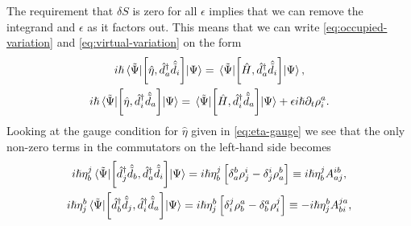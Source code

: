             The requirement that $\delta S$ is zero for all $\epsilon$ implies
            that we can remove the integrand and $\epsilon$ as it factors out.
            This means that we can write \autoref{eq:occupied-variation} and
            \autoref{eq:virtual-variation} on the form
            \begin{gather}
                i\hslash\mel*{\tilde{\Psi}}{
                    \left[
                        \hat{\eta}
                    , 
                        \hat{d}^{\dagger}_{a}\hat{\tilde{d}}_{i}
                    \right]
                }{\Psi}
                =
                \mel*{\tilde{\Psi}}{
                    \left[
                        \hat{H}
                    , 
                        \hat{d}^{\dagger}_{a}\hat{\tilde{d}}_{i}
                    \right]
                }{\Psi},
                \\
                i\hslash\mel*{\tilde{\Psi}}{
                    \left[
                        \hat{\eta}
                    , 
                        \hat{d}^{\dagger}_{i}\hat{\tilde{d}}_{a}
                    \right]
                }{\Psi}
                =
                \mel*{\tilde{\Psi}}{
                    \left[
                        \hat{H}
                    , 
                        \hat{d}^{\dagger}_{i}\hat{\tilde{d}}_{a}
                    \right]
                }{\Psi}
                + \epsilon i\hslash\partial_t\rho^{a}_{i}.
            \end{gather}
            Looking at the gauge condition for $\hat{\eta}$ given in
            \autoref{eq:eta-gauge} we see that the only non-zero terms in the
            commutators on the left-hand side becomes
            \begin{gather}
                i\hslash\eta^{j}_{b}\mel*{\tilde{\Psi}}{
                    \left[
                        \hat{d}^{\dagger}_{j}\hat{\tilde{d}}_{b}
                    , 
                        \hat{d}^{\dagger}_{a}\hat{\tilde{d}}_{i}
                    \right]
                }{\Psi}
                = i\hslash\eta^{j}_{b}\left[ 
                    \delta^{b}_{a}\rho^{i}_{j}
                    - \delta^{i}_{j}\rho^{b}_{a}
                 \right]
                \equiv
                i\hslash\eta^{j}_{b}A^{ib}_{aj},
                \\
                i\hslash\eta^{b}_{j}\mel*{\tilde{\Psi}}{
                    \left[
                        \hat{d}^{\dagger}_{b}\hat{\tilde{d}}_{j}
                    , 
                        \hat{d}^{\dagger}_{i}\hat{\tilde{d}}_{a}
                    \right]
                }{\Psi}
                =
                i\hslash\eta^{b}_{j}\left[ 
                    \delta^{j}_{i}\rho^{a}_{b}
                    - \delta^{a}_{b}\rho^{j}_{i}
                 \right]
                \equiv
                -i\hslash\eta^{b}_{j}
                A^{ja}_{bi},
            \end{gather}
